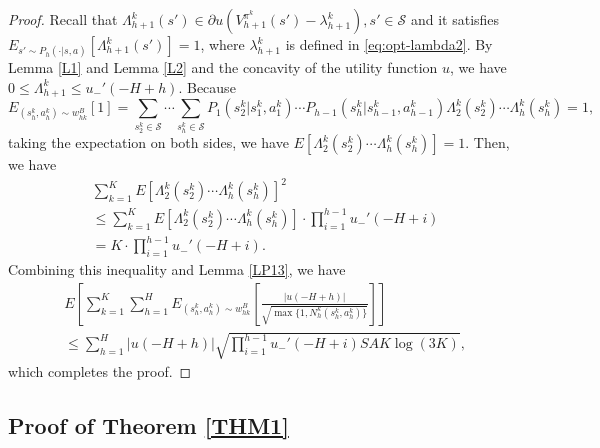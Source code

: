 \documentclass[11pt]{article}
\newcommand{\1}{\mathbbm{1}}
\begin{document}
\begin{proof}
Recall that $\Lambda^k_{h+1}(s')\in\partial u(V_{h+1}^{\pi^k}(s')-\lambda_{h+1}^k), s'\in\mathcal{S}$ and it satisfies $E_{s'\sim P_h(\cdot\vert s,a)}\left[\Lambda_{h+1}^k(s')\right]=1$, where $\lambda_{h+1}^k$ is defined in \eqref{eq:opt-lambda2}. By Lemma \ref{L1} and Lemma \ref{L2} and the concavity of the utility function $u$, we have $0\leq\Lambda_{h+1}^k\leq u_{-}'(-H+h)$. Because $$E_{(s_h^k,a_h^k)\sim w_{hk}^{B}}[1]=\sum_{s_{2}^k\in\mathcal{S}}\cdots \sum_{s_{h}^k\in \mathcal{S}}P_{1}(s_{2}^k\vert s_1^k,a_1^k)\cdots P_{h-1}(s_{h}^k\vert s_{h-1}^k,a_{h-1}^k)\Lambda_2^k(s_2^k)\cdots \Lambda_h^k(s_h^k)=1,$$ taking the expectation on both sides, we have $E\left[\Lambda_2^k(s_2^k)\cdots\Lambda_h^k(s_h^k)\right ]=1$. Then, we have
\begin{align*}
&\sum_{k=1}^K E\left [\Lambda_2^k(s_2^k)\cdots\Lambda_h^k(s_h^k)\right ]^2\\
&\leq \sum_{k=1}^K E\left [\Lambda_2^k(s_2^k)\cdots\Lambda_h^k(s_h^k)\right ]\cdot \prod\limits_{i=1}^{h-1} u_{-}'(-H+i)\\
&=K\cdot \prod\limits_{i=1}^{h-1} u_{-}'(-H+i).
\end{align*}
Combining this inequality and Lemma \ref{LP13}, we have
\begin{align*}
&E\left [\sum_{k=1}^K\sum_{h=1}^H E_{(s_h^k,a_h^k)\sim w_{hk}^{B}}\left [\frac{\vert u(-H+h)\vert}{\sqrt{\max\{1,N_h^k(s_h^k,a_h^k)\}}}\right ]\right ]\\
&\leq \sum_{h=1}^H \vert u(-H+h)\vert \sqrt{\prod\limits_{i=1}^{h-1} u_{-}'(-H+i)SAK\log(3K)},
\end{align*}
which completes the proof.
\end{proof}

\subsection{Proof of Theorem \ref{THM1}}\label{PFTHM1}
\end{document}
